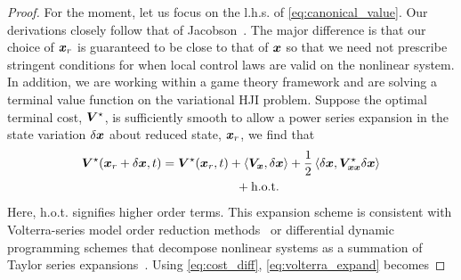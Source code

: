 \begin{proof}
	For the moment, let us focus on the l.h.s. of \eqref{eq:canonical_value}. Our derivations  closely follow that of Jacobson~\cite{Jacobson1968new}. The major difference is that our choice of $\bm{x}_r$ is guaranteed to be close to that of $\bm{x}$ so that we need not prescribe stringent conditions for when local control laws are valid on the nonlinear system. In addition,  we are working within a game theory framework and are solving a terminal value function on the variational HJI problem.  Suppose the optimal terminal cost, $\bm{V}^\star$, is sufficiently smooth to allow a power series expansion in the state variation $\delta \bm{x}$ about reduced state, $\bm{x}_r$, we find that 
	\begin{align}
		\valuefunc^\star(\state_r + \delta \state, t) &= \valuefunc^\star(\state_r, t) + \left\langle\valuefunc_{\state}, \delta \state \right\rangle + \dfrac{1}{2} \left\langle \delta \state, \valuefunc^\star_{\state\state} \delta\state \right\rangle \nonumber \\
		& \qquad\qquad\qquad  + \text{h.o.t}.
		\label{eq:volterra_expand}
	\end{align}
	Here, h.o.t. signifies higher order terms. This expansion scheme is consistent with  Volterra-series model order reduction methods~\cite{QLMOR} or differential dynamic programming schemes that  decompose nonlinear systems as a summation of Taylor series expansions~\cite{JacobsonMayne}.  Using \eqref{eq:cost_diff},  \eqref{eq:volterra_expand} becomes

\end{proof}
